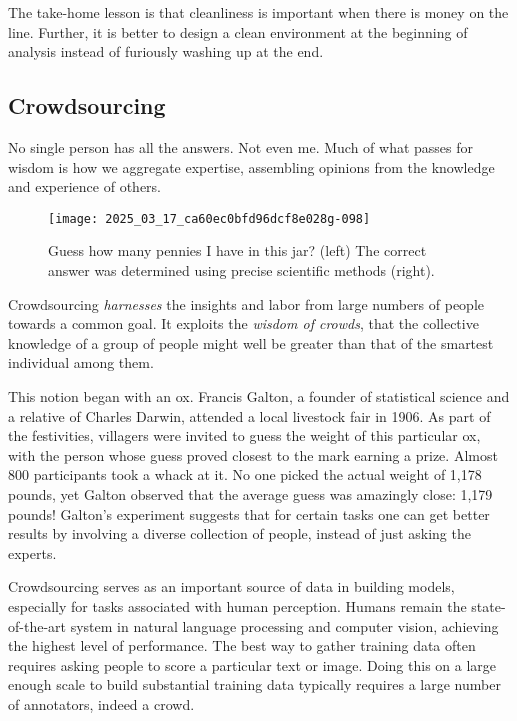 \documentclass[10pt]{article}
\begin{document}
The take-home lesson is that cleanliness is important when there is money on the line. Further, it is better to design a clean environment at the beginning of analysis instead of furiously washing up at the end.

\subsection{Crowdsourcing}

No single person has all the answers. Not even me. Much of what passes for wisdom is how we aggregate expertise, assembling opinions from the knowledge and experience of others.

\begin{figure}[h]
    \centering
    \texttt{[image: 2025\_03\_17\_ca60ec0bfd96dcf8e028g-098]}
    \caption{Guess how many pennies I have in this jar? (left) The correct answer was determined using precise scientific methods (right).}
\end{figure}

Crowdsourcing \textit{harnesses} the insights and labor from large numbers of people towards a common goal. It exploits the \textit{wisdom of crowds}, that the collective knowledge of a group of people might well be greater than that of the smartest individual among them.

This notion began with an ox. Francis Galton, a founder of statistical science and a relative of Charles Darwin, attended a local livestock fair in 1906. As part of the festivities, villagers were invited to guess the weight of this particular ox, with the person whose guess proved closest to the mark earning a prize. Almost 800 participants took a whack at it. No one picked the actual weight of 1,178 pounds, yet Galton observed that the average guess was amazingly close: 1,179 pounds! Galton's experiment suggests that for certain tasks one can get better results by involving a diverse collection of people, instead of just asking the experts.

Crowdsourcing serves as an important source of data in building models, especially for tasks associated with human perception. Humans remain the state-of-the-art system in natural language processing and computer vision, achieving the highest level of performance. The best way to gather training data often requires asking people to score a particular text or image. Doing this on a large enough scale to build substantial training data typically requires a large number of annotators, indeed a crowd.
\end{document}
